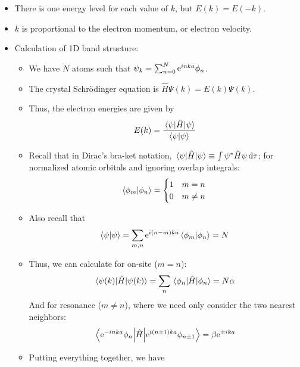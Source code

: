 \documentclass[../notes.tex]{subfiles}
\begin{document}
\begin{itemize}
\begin{itemize}
    \end{itemize}
    \item There is one energy level for each value of $k$, but $E(k)=E(-k)$.
    \item $k$ is proportional to the electron momentum, or electron velocity.
    \item Calculation of 1D band structure:
    \begin{itemize}
        \item We have $N$ atoms such that $\psi_k=\sum_{n=0}^N\e[inka]\phi_n$.
        \item The crystal Schr\"{o}dinger equation is $\hat{H}\Psi(k)=E(k)\Psi(k)$.
        \item Thus, the electron energies are given by
        \begin{equation*}
            E(k) = \frac{\ev{\hat{H}}{\psi}}{\braket{\psi}}
        \end{equation*}
        \item Recall that in Dirac's bra-ket notation, $\ev{\hat{H}}{\psi}\equiv\int\psi^*\hat{H}\psi\dd{\tau}$; for normalized atomic orbitals and ignoring overlap integrals:
        \begin{equation*}
            \braket{\phi_m}{\phi_n} =
            \begin{cases}
                1 & m=n\\
                0 & m\neq n
            \end{cases}
        \end{equation*}
        \item Also recall that
        \begin{equation*}
            \braket{\psi} = \sum_{m,n}\e[i(n-m)ka]\braket{\phi_m}{\phi_n} = N
        \end{equation*}
        \item Thus, we can calculate for on-site ($m=n$):
        \begin{equation*}
            \ev{\hat{H}}{\psi(k)} = \sum_n\ev{\hat{H}}{\phi_n} = N\alpha
        \end{equation*}
        And for resonance ($m\neq n$), where we need only consider the two nearest neighbors:
        \begin{equation*}
            \mel{\e[-inka]\phi_n}{\hat{H}}{\e[i(n\pm 1)ka]\phi_{n\pm 1}} = \beta\e[\pm ika]
        \end{equation*}
        \item Putting everything together, we have
        \begin{equation*}

\end{equation*}
\end{itemize}
\end{itemize}
\end{document}
